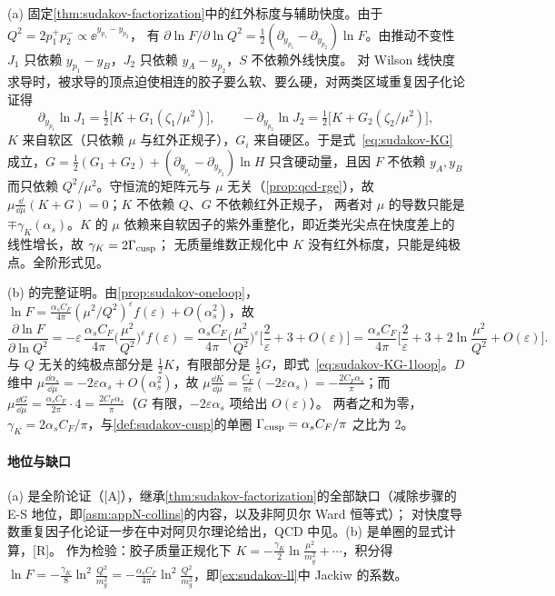 \begin{proofsketch}
(a) 固定\cref{thm:sudakov-factorization}中的红外标度与辅助快度。由于 $Q^2=2p_1^+p_2^-\propto\ee^{y_{p_1}-y_{p_2}}$，
有 $\partial\ln F/\partial\ln Q^2=\frac12(\partial_{y_{p_1}}-\partial_{y_{p_2}})\ln F$。由推动不变性 $J_1$ 只依赖 $y_{p_1}-y_B$，$J_2$ 只依赖 $y_A-y_{p_2}$，$S$ 不依赖外线快度。
对 Wilson 线快度求导时，被求导的顶点迫使相连的胶子要么软、要么硬，对两类区域重复因子化论证得
\[
\partial_{y_{p_1}}\ln J_1=\tfrac12\big[K+G_1(\zeta_1/\mu^2)\big],\qquad -\partial_{y_{p_2}}\ln J_2=\tfrac12\big[K+G_2(\zeta_2/\mu^2)\big],
\]
$K$ 来自软区（只依赖 $\mu$ 与红外正规子），$G_i$ 来自硬区\cite[式~(10.112)--(10.117)]{Collins2011}。于是式~\eqref{eq:sudakov-KG} 成立，$G=\frac12(G_1+G_2)+(\partial_{y_{p_1}}-\partial_{y_{p_2}})\ln H$
只含硬动量，且因 $F$ 不依赖 $y_A,y_B$ 而只依赖 $Q^2/\mu^2$。守恒流的矩阵元与 $\mu$ 无关（\cref{prop:qcd-rge}），故 $\mu\frac{\dd}{\dd\mu}(K+G)=0$；$K$ 不依赖 $Q$、$G$ 不依赖红外正规子，
两者对 $\mu$ 的导数只能是 $\mp\gamma_K(\alpha_s)$。$K$ 的 $\mu$ 依赖来自软因子的紫外重整化，即近类光尖点在快度差上的线性增长，故 $\gamma_K=2\Gamma_{\rm cusp}$\cite{Korchemsky1989,KorchemskyRadyushkin1987}；
无质量维数正规化中 $K$ 没有红外标度，只能是纯极点。全阶形式见\cite{Collins:1980ih,Collins:1989bt,Magnea:1990zb}。

(b) 的完整证明。由\cref{prop:sudakov-oneloop}，$\ln F=\frac{\alpha_sC_F}{4\pi}(\mu^2/Q^2)^\varepsilon f(\varepsilon)+O(\alpha_s^2)$，故
\[
\frac{\partial\ln F}{\partial\ln Q^2}=-\varepsilon\,\frac{\alpha_sC_F}{4\pi}\Big(\frac{\mu^2}{Q^2}\Big)^{\varepsilon}f(\varepsilon)
=\frac{\alpha_sC_F}{4\pi}\Big(\frac{\mu^2}{Q^2}\Big)^{\varepsilon}\Big[\frac2\varepsilon+3+O(\varepsilon)\Big]
=\frac{\alpha_sC_F}{4\pi}\Big[\frac2\varepsilon+3+2\ln\frac{\mu^2}{Q^2}+O(\varepsilon)\Big].
\]
与 $Q$ 无关的纯极点部分是 $\frac12K$，有限部分是 $\frac12G$，即式~\eqref{eq:sudakov-KG-1loop}。$D$ 维中 $\mu\frac{\dd\alpha_s}{\dd\mu}=-2\varepsilon\alpha_s+O(\alpha_s^2)$，故
$\mu\frac{\dd K}{\dd\mu}=\frac{C_F}{\pi\varepsilon}(-2\varepsilon\alpha_s)=-\frac{2C_F\alpha_s}\pi$；而 $\mu\frac{\dd G}{\dd\mu}=\frac{\alpha_sC_F}{2\pi}\cdot4=\frac{2C_F\alpha_s}\pi$（$G$ 有限，$-2\varepsilon\alpha_s$ 项给出 $O(\varepsilon)$）。
两者之和为零，$\gamma_K=2\alpha_sC_F/\pi$，与\cref{def:sudakov-cusp}的单圈 $\Gamma_{\rm cusp}=\alpha_sC_F/\pi$ 之比为 $2$。
\end{proofsketch}

\paragraph{地位与缺口}(a) 是全阶论证（[A]），继承\cref{thm:sudakov-factorization}的全部缺口（减除步骤的 E-S 地位，即\cref{asm:appN-collins}的内容，以及非阿贝尔 Ward 恒等式）；
对快度导数重复因子化论证一步在\cite[第~10.10~节]{Collins2011}中对阿贝尔理论给出，QCD 中见\cite{Collins:1989bt,Magnea:1990zb}。(b) 是单圈的显式计算，[R]。
作为检验：胶子质量正规化下 $K=-\frac{\gamma_K}2\ln\frac{\mu^2}{m_g^2}+\cdots$，积分得 $\ln F=-\frac{\gamma_K}8\ln^2\frac{Q^2}{m_g^2}=-\frac{\alpha_sC_F}{4\pi}\ln^2\frac{Q^2}{m_g^2}$，即\cref{ex:sudakov-ll}中 Jackiw 的系数。

